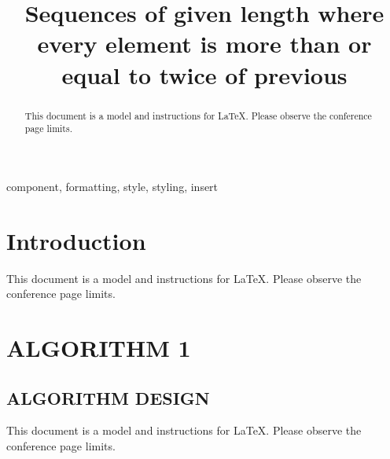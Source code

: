 \documentclass[conference]{IEEEtran}
\begin{document}
\title{Sequences of given length where every element is more than or equal to twice of previous\\
}

\author{
\and
{}
\and
{}
}

\maketitle

\begin{abstract}
This document is a model and instructions for \LaTeX.
Please observe the conference page limits. 
\end{abstract}

\begin{IEEEkeywords}
component, formatting, style, styling, insert
\end{IEEEkeywords}

\section{Introduction}
This document is a model and instructions for \LaTeX.
Please observe the conference page limits. 

\section{ALGORITHM 1}

\subsection{ALGORITHM DESIGN}

This document is a model and instructions for \LaTeX.
Please observe the conference page limits. 
\end{document}
